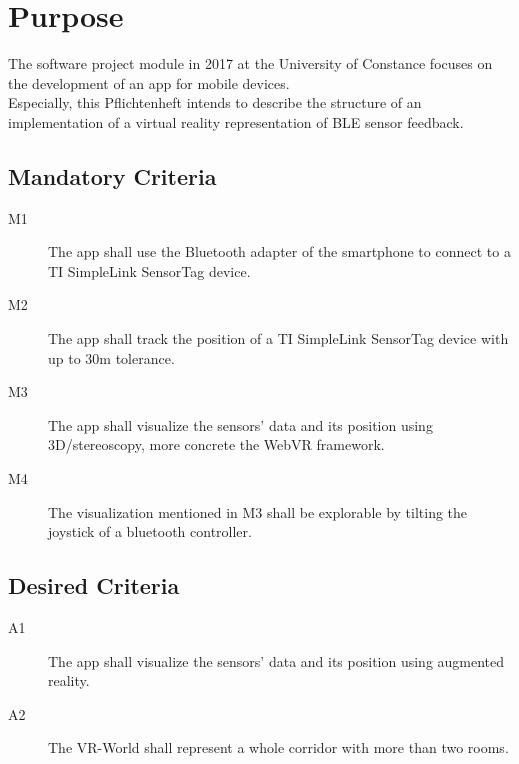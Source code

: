 \section{Purpose}
The software project module in 2017 at the University of Constance focuses on the development of an app for mobile devices. \\
Especially, this Pflichtenheft intends to describe the structure of an implementation of a virtual reality representation of BLE sensor feedback.

\subsection{Mandatory Criteria}

\begin{description}
  \item[M1] The app shall use the Bluetooth adapter of the smartphone to connect to a TI SimpleLink SensorTag device.
  \item[M2] The app shall track the position of a TI SimpleLink SensorTag device with up to 30m tolerance.
  \item[M3] The app shall visualize the sensors' data and its position using 3D/stereoscopy, more concrete the WebVR framework.
  \item[M4] The visualization mentioned in M3 shall be explorable by tilting the joystick of a bluetooth controller.
\end{description}

\subsection{Desired Criteria}

\begin{description}
  \item[A1] The app shall visualize the sensors' data and its position using augmented reality.
  \item[A2] The VR-World shall represent a whole corridor with more than two rooms.
\end{description}
